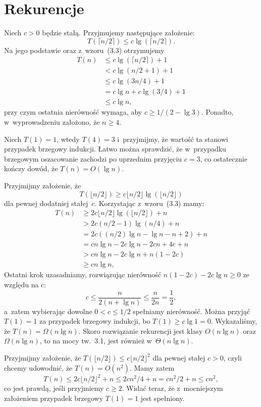 \chapter{Rekurencje}


\exercise %
Niech $c>0$ będzie stałą. Przyjmujemy następujące założenie:
\[
	T(\lceil n/2\rceil) \le c\lg(\lceil n/2\rceil).
\]
Na jego podstawie oraz z~wzoru~(3.3) otrzymujemy
\begin{align*}
	T(n) &\le c\lg(\lceil n/2\rceil)+1 \\
	&< c\lg(n/2+1)+1 \\
	&\le c\lg(3n/4)+1 \\
	&= c\lg n+c\lg(3/4)+1 \\
	&\le c\lg n,
\end{align*}
przy czym ostatnia nierówność wymaga, aby $c\ge1/(2-\lg3)$. Ponadto, w~wyprowadzeniu założono, że $n\ge4$.

Niech $T(1)=1$, wtedy $T(4)=3$ i~przyjmijmy, że wartość ta stanowi przypadek brzegowy indukcji. Łatwo można sprawdzić, że w~przypadku brzegowym oszacowanie zachodzi po uprzednim przyjęciu $c=3$, co ostatecznie kończy dowód, że $T(n)=O(\lg n)$.

\exercise %
Przyjmijmy założenie, że
\[
	T(\lfloor n/2\rfloor) \ge c\lfloor n/2\rfloor\lg(\lfloor n/2\rfloor)
\]
dla pewnej dodatniej stałej~$c$. Korzystając z~wzoru~(3.3) mamy:
\begin{align*}
	T(n) &\ge 2c\lfloor n/2\rfloor\lg(\lfloor n/2\rfloor)+n \\
	&> 2c(n/2-1)\lg(n/4)+n \\
	&= 2c((n/2)\lg n-\lg n-n+2)+n \\
	&= cn\lg n-2c\lg n-2cn+4c+n \\
	&> cn\lg n-2c\lg n+n(1-2c) \\
	&\ge cn\lg n,
\end{align*}
Ostatni krok uzasadniamy, rozwiązując nierówność $n(1-2c)-2c\lg n\ge0$ ze względu na $c$:
\[
	c \le \frac{n}{2(n+\lg n)} \le \frac{n}{2n} = \frac{1}{2},
\]
a~zatem wybierając dowolne $0<c\le1/2$ spełniamy nierówność. Można przyjąć $T(1)=1$ za przypadek brzegowy indukcji, bo $T(1)\ge c\lg1=0$. Wykazaliśmy, że $T(n)=\Omega(n\lg n)$. Skoro rozwiązanie rekurencji jest klasy $O(n\lg n)$ oraz $\Omega(n\lg n)$, to na mocy tw.~3.1, jest również w~$\Theta(n\lg n)$.

\exercise %
Przyjmijmy założenie, że $T(\lfloor n/2\rfloor)\le c\lfloor n/2\rfloor^2$ dla pewnej stałej $c>0$, czyli chcemy udowodnić, że $T(n)=O(n^2)$. Mamy zatem
\[
	T(n) \le 2c\lfloor n/2\rfloor^2+n \le 2cn^2\!/4 + n = cn^2\!/2+n \le cn^2,
\]
co jest prawdą, jeśli przyjmiemy $c\ge2$. Widać teraz, że z~mocniejszym założeniem przypadek brzegowy $T(1)=1$ jest spełniony.

